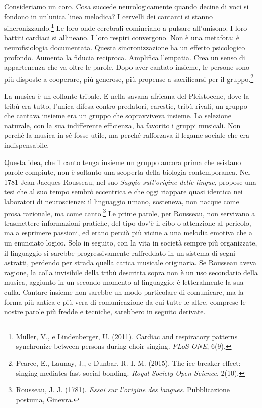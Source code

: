 Consideriamo un coro. Cosa succede neurologicamente quando decine di voci si fondono in un'unica linea melodica? I cervelli dei cantanti si stanno sincronizzando.\footnote{M\"uller, V., e Lindenberger, U. (2011). Cardiac and respiratory patterns synchronize between persons during choir singing. \textit{PLoS ONE}, 6(9).} Le loro onde cerebrali cominciano a pulsare all'unisono. I loro battiti cardiaci si allineano. I loro respiri convergono. Non \`{e} una metafora: \`{e} neurofisiologia documentata. Questa sincronizzazione ha un effetto psicologico profondo. Aumenta la fiducia reciproca. Amplifica l'empatia. Crea un senso di appartenenza che va oltre le parole. Dopo aver cantato insieme, le persone sono pi\`{u} disposte a cooperare, pi\`{u} generose, pi\`{u} propense a sacrificarsi per il gruppo.\footnote{Pearce, E., Launay, J., e Dunbar, R. I. M. (2015). The ice breaker effect: singing mediates fast social bonding. \textit{Royal Society Open Science}, 2(10).}

La musica \`{e} un collante tribale. E nella savana africana del Pleistocene, dove la trib\`{u} era tutto, l'unica difesa contro predatori, carestie, trib\`{u} rivali, un gruppo che cantava insieme era un gruppo che sopravviveva insieme. La selezione naturale, con la sua indifferente efficienza, ha favorito i gruppi musicali. Non perch\'{e} la musica in s\'{e} fosse utile, ma perch\'{e} rafforzava il legame sociale che era indispensabile.

Questa idea, che il canto tenga insieme un gruppo ancora prima che esistano parole compiute, non \`{e} soltanto una scoperta della biologia contemporanea. Nel 1781 Jean Jacques Rousseau, nel suo \textit{Saggio sull'origine delle lingue}, propose una tesi che al suo tempo sembr\`{o} eccentrica e che oggi riappare quasi identica nei laboratori di neuroscienze: il linguaggio umano, sosteneva, non nacque come prosa razionale, ma come canto.\footnote{Rousseau, J. J. (1781). \textit{Essai sur l'origine des langues}. Pubblicazione postuma, Ginevra.} Le prime parole, per Rousseau, non servivano a trasmettere informazioni pratiche, del tipo dov'\`{e} il cibo o attenzione al pericolo, ma a esprimere passioni, ed erano perci\`{o} pi\`{u} vicine a una melodia emotiva che a un enunciato logico. Solo in seguito, con la vita in societ\`{a} sempre pi\`{u} organizzate, il linguaggio si sarebbe progressivamente raffreddato in un sistema di segni astratti, perdendo per strada quella carica musicale originaria. Se Rousseau aveva ragione, la colla invisibile della trib\`{u} descritta sopra non \`{e} un uso secondario della musica, aggiunto in un secondo momento al linguaggio: \`{e} letteralmente la sua culla. Cantare insieme non sarebbe un modo particolare di comunicare, ma la forma pi\`{u} antica e pi\`{u} vera di comunicazione da cui tutte le altre, comprese le nostre parole pi\`{u} fredde e tecniche, sarebbero in seguito derivate.

